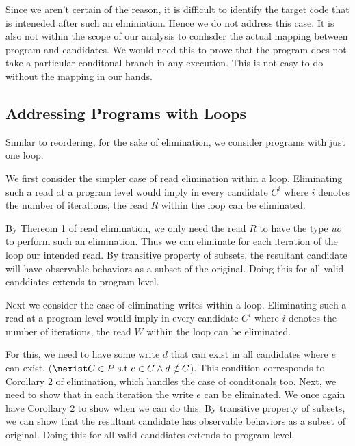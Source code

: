         Since we aren't certain of the reason, it is difficult to identify the target code that is inteneded after such an elminiation. Hence we do not address this case. It is also not within the scope of our analysis to conhsder the actual mapping between program and candidates. We would need this to prove that the program does not take a particular conditonal branch in any execution. This is not easy to do without the mapping in our hands. 


    \subsection{Addressing Programs with Loops}
    
        Similar to reordering, for the sake of elimination, we consider programs with just one loop. 
        
        We first consider the simpler case of read elimination within a loop. 
        Eliminating such a read at a program level would imply in every candidate $C^i$ where $i$ denotes the number of iterations, the read $R$ within the loop can be eliminated.
        
        By Thereom 1 of read elimination, we only need the read $R$ to have the type $uo$ to perform such an elimination.
        Thus we can eliminate for each iteration of the loop our intended read. 
        By transitive property of subsets, the resultant candidate will have observable behaviors as a subset of the original. 
        Doing this for all valid canddiates extends to program level.

        Next we consider the case of eliminating writes within a loop. 
        Eliminating such a read at a program level would imply in every candidate $C^i$ where $i$ denotes the number of iterations, the read $W$ within the loop can be eliminated.

        For this, we need to have some write $d$ that can exist in all candidates where $e$ can exist. ($\nexist C \in P \ \text{s.t} \ e \in C \wedge d \notin C$). This condition corresponds to Corollary 2 of elimination, which handles the case of conditonals too. 
        Next, we need to show that in each iteration the write $e$ can be eliminated. We once again have Corollary 2 to show when we can do this. 
        By transitive property of subsets, we can show that the resultant candidate has observable behaviors as a subset of original. 
        Doing this for all valid canddiates extends to program level.
         


